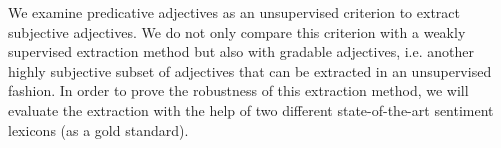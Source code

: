 We examine predicative adjectives as an unsupervised criterion to extract subjective adjectives.
 We do not only compare this criterion with a weakly supervised extraction
 method but also with gradable adjectives, i.e. another highly subjective subset
 of adjectives that can be extracted in an unsupervised fashion.
 In order to prove the robustness of this extraction method, we will evaluate
 the extraction with the help of two different state-of-the-art sentiment
 lexicons (as a gold standard).

